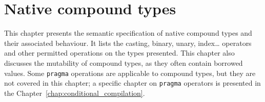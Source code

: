 \chapter{Native compound types}
\pagecolor{gray!10!white}
\label{chap:chap4}

This chapter presents the semantic specification of native compound types and
their associated behaviour. It lists the casting, binary, unary, index\ldots
operators and other permitted operations on the types presented. This chapter
also discusses the mutability of compound types, as they often contain borrowed
values. Some \texttt{pragma} operations are applicable to compound types, but
they are not covered in this chapter; a specific chapter on \texttt{pragma}
operators is presented in the Chapter~\ref{chap:conditional_compilation}.

\minitoc%









